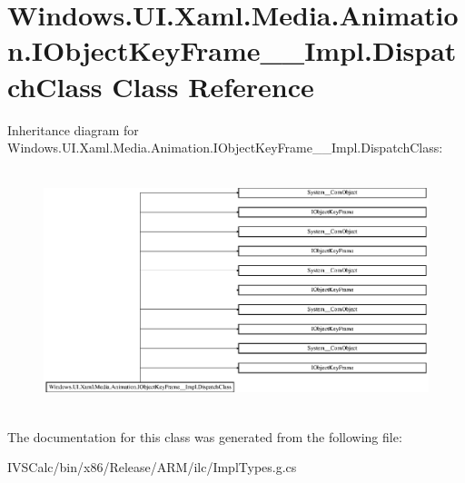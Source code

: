 \hypertarget{class_windows_1_1_u_i_1_1_xaml_1_1_media_1_1_animation_1_1_i_object_key_frame_____impl_1_1_dispatch_class}{}\section{Windows.\+U\+I.\+Xaml.\+Media.\+Animation.\+I\+Object\+Key\+Frame\+\_\+\+\_\+\+Impl.\+Dispatch\+Class Class Reference}
\label{class_windows_1_1_u_i_1_1_xaml_1_1_media_1_1_animation_1_1_i_object_key_frame_____impl_1_1_dispatch_class}
Inheritance diagram for Windows.\+U\+I.\+Xaml.\+Media.\+Animation.\+I\+Object\+Key\+Frame\+\_\+\+\_\+\+Impl.\+Dispatch\+Class\+:\begin{figure}[H]
\begin{center}
\leavevmode
\includegraphics[height=7.048055cm]{class_windows_1_1_u_i_1_1_xaml_1_1_media_1_1_animation_1_1_i_object_key_frame_____impl_1_1_dispatch_class}
\end{center}
\end{figure}


The documentation for this class was generated from the following file\+:\begin{DoxyCompactItemize}
\item 
I\+V\+S\+Calc/bin/x86/\+Release/\+A\+R\+M/ilc/Impl\+Types.\+g.\+cs\end{DoxyCompactItemize}
